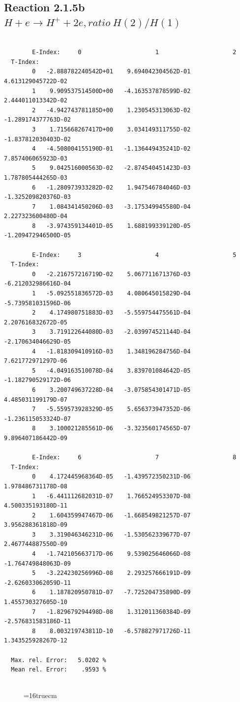\documentclass[12pt,dvips]{article}
\begin{document}
\newpage
\subsection{
Reaction 2.1.5b  $H + e \rightarrow H^+ + 2e, ratio~ H(2)/H(1)$
}


\begin{small}\begin{verbatim}

        E-Index:     0                     1                     2
  T-Index:
        0   -2.888782240542D+01    9.694042304562D-01    4.613129045722D-02
        1    9.909537514500D+00   -4.163537878599D-02    2.444011013342D-02
        2   -4.942743781185D+00    1.230545313063D-02   -1.289174377763D-02
        3    1.715668267417D+00    3.034149311755D-02   -1.837812030403D-02
        4   -4.508004155190D-01   -1.136449435241D-02    7.857406065923D-03
        5    9.042516000563D-02   -2.874540451423D-03    1.787805444265D-03
        6   -1.280973933282D-02    1.947546784046D-03   -1.325209820376D-03
        7    1.084341450206D-03   -3.175349945580D-04    2.227323600480D-04
        8   -3.974359134401D-05    1.688199339120D-05   -1.209472946500D-05

        E-Index:     3                     4                     5
  T-Index:
        0   -2.216757216719D-02    5.067711671376D-03   -6.212032986616D-04
        1   -5.092551836572D-03    4.080645015829D-04   -5.739581031596D-06
        2    4.174980751883D-03   -5.559754475561D-04    2.207616832672D-05
        3    3.719122644080D-03   -2.039974521144D-04   -2.170634046629D-05
        4   -1.818309410916D-03    1.348196284756D-04    7.621772971297D-06
        5   -4.049163510078D-04    3.839701084642D-05   -1.182790529172D-06
        6    3.200749637228D-04   -3.075854301471D-05    4.485031199179D-07
        7   -5.559573928329D-05    5.656373947352D-06   -1.236115053324D-07
        8    3.100021285561D-06   -3.323560174565D-07    9.896407186442D-09

        E-Index:     6                     7                     8
  T-Index:
        0    4.172445968364D-05   -1.439572350231D-06    1.978486731178D-08
        1   -6.441112682031D-07    1.766524953307D-08    4.500335193180D-11
        2    1.604359947467D-06   -1.668549821257D-07    3.956288361818D-09
        3    3.319046346231D-06   -1.530562339677D-07    2.467744887550D-09
        4   -1.742105663717D-06    9.539025646066D-08   -1.764749848063D-09
        5   -3.224230256996D-08    2.293257666191D-09   -2.626033062059D-11
        6    1.187820950781D-07   -7.725204735890D-09    1.455730327605D-10
        7   -1.829679294498D-08    1.312011360384D-09   -2.576831583186D-11
        8    8.003219743811D-10   -6.578827971726D-11    1.343525928267D-12

  Max. rel. Error:   5.0202 %
  Mean rel. Error:    .9593 %


\end{verbatim}\end{small}
\begin{figure} \label{2.1.5b}
\epsfxsize=16truecm
\end{figure}
\end{document}
